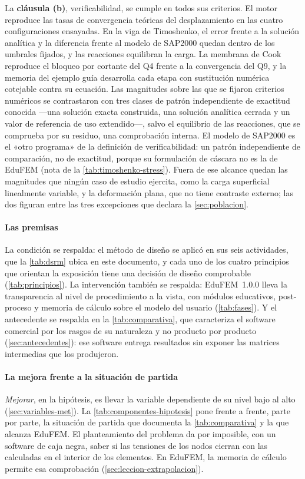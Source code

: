 La \textbf{cláusula (b)}, verificabilidad, se cumple en todos sus criterios. El motor reproduce las tasas de convergencia teóricas del desplazamiento en las cuatro configuraciones ensayadas. En la viga de Timoshenko, el error frente a la solución analítica y la diferencia frente al modelo de SAP2000 quedan dentro de los umbrales fijados, y las reacciones equilibran la carga. La membrana de Cook reproduce el bloqueo por cortante del Q4 frente a la convergencia del Q9, y la memoria del ejemplo guía desarrolla cada etapa con sustitución numérica cotejable contra su ecuación. Las magnitudes sobre las que se fijaron criterios numéricos se contrastaron con tres clases de patrón independiente de exactitud conocida ---una solución exacta construida, una solución analítica cerrada y un valor de referencia de uso extendido---, salvo el equilibrio de las reacciones, que se comprueba por su residuo, una comprobación interna. El modelo de SAP2000 es el «otro programa» de la definición de verificabilidad: un patrón independiente de comparación, no de exactitud, porque su formulación de cáscara no es la de EduFEM (nota de la \autoref{tab:timoshenko-stress}). Fuera de ese alcance quedan las magnitudes que ningún caso de estudio ejercita, como la carga superficial linealmente variable, y la deformación plana, que no tiene contraste externo; las dos figuran entre las tres excepciones que declara la \autoref{sec:poblacion}.

\paragraph{Las premisas} La condición se respalda: el método de diseño se aplicó en sus seis actividades, que la \autoref{tab:dsrm} ubica en este documento, y cada uno de los cuatro principios que orientan la exposición tiene una decisión de diseño comprobable (\autoref{tab:principios}). La intervención también se respalda: EduFEM~1.0.0 lleva la transparencia al nivel de procedimiento a la vista, con módulos educativos, post-proceso y memoria de cálculo sobre el modelo del usuario (\autoref{tab:fases}). Y el antecedente se respalda en la \autoref{tab:comparativa}, que caracteriza el software comercial por los rasgos de su naturaleza y no producto por producto (\autoref{sec:antecedentes}): ese software entrega resultados sin exponer las matrices intermedias que los produjeron.

\paragraph{La mejora frente a la situación de partida} \emph{Mejorar}, en la hipótesis, es llevar la variable dependiente de su nivel bajo al alto (\autoref{sec:variables-met}). La \autoref{tab:componentes-hipotesis} pone frente a frente, parte por parte, la situación de partida que documenta la \autoref{tab:comparativa} y la que alcanza EduFEM. El planteamiento del problema da por imposible, con un software de caja negra, saber si las tensiones de los nodos cierran con las calculadas en el interior de los elementos. En EduFEM, la memoria de cálculo permite esa comprobación (\autoref{sec:leccion-extrapolacion}).

